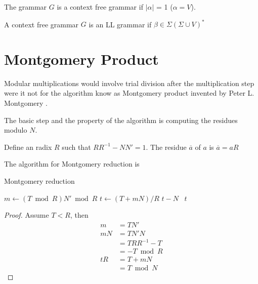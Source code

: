 \begin{defn}
  The grammar $G$ is a context free grammar if $|\alpha|$ = 1 ($\alpha = V$).
\end{defn}

\begin{defn}[LL grammar]
  A context free grammar $G$ is an LL grammar if $\beta \in \Sigma
  (\Sigma \cup V)^*$
\end{defn}

\section{Montgomery Product}

Modular multiplications would involve trial division after the
multiplication step were it not for the algorithm know as Montgomery
product invented by Peter L. Montgomery \cite{Montgomery}.

The basic step and the property of the algorithm is computing the
residues modulo $N$.

\begin{defn}
  Define an radix $R$ such that $R R^{-1} - N N' = 1$. The residue
  $\overline{a}$ of $a$ is $\overline{a} = a R$
\end{defn}

\begin{thm}
  The algorithm for Montgomery reduction is
  \begin{algorithm}[hbt!]
    \caption{Montgomery reduction}
    \begin{algorithmic}
      \State $m \gets (T \bmod{R}) N' \bmod{R}$
      \State $t \gets (T + m N)/R$
       \Return $t - N$
      \Else \, \Return $t$
      \EndIf
      \EndFunction
    \end{algorithmic}
  \end{algorithm}
\end{thm}
\begin{proof}
  Assume $T < R$, then
  \begin{align*}
      m & = T N' \\
    m N & = T N' N \\
        & = T R R^{-1} - T \\
        & = - T \bmod{R} \\
    t R & = T + m N \\
        & = T \bmod{N}
  \end{align*}
\end{proof}

